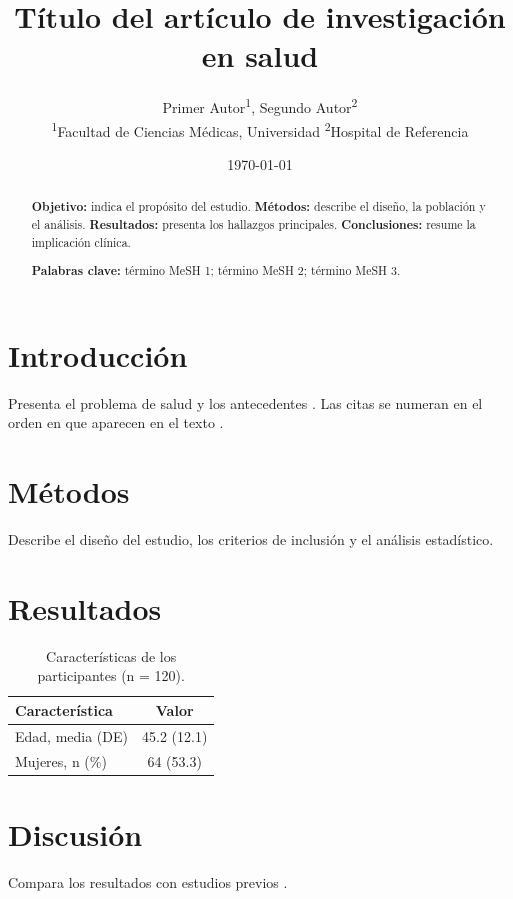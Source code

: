 \documentclass[11pt,a4paper]{article}
\title{Título del artículo de investigación en salud}
\author{Primer Autor\textsuperscript{1}, Segundo Autor\textsuperscript{2}\\[0.5em]
  \small\textsuperscript{1}Facultad de Ciencias Médicas, Universidad \quad
  \textsuperscript{2}Hospital de Referencia}
\date{\today}
\begin{document}
\maketitle

\begin{abstract}
\textbf{Objetivo:} indica el propósito del estudio.
\textbf{Métodos:} describe el diseño, la población y el análisis.
\textbf{Resultados:} presenta los hallazgos principales.
\textbf{Conclusiones:} resume la implicación clínica.

\medskip
\noindent\textbf{Palabras clave:} término MeSH 1; término MeSH 2; término MeSH 3.
\end{abstract}

\section{Introducción}
Presenta el problema de salud y los antecedentes \cite{icmje2019}. Las citas se
numeran en el orden en que aparecen en el texto \cite{lamport1994,knuth1984}.

\section{Métodos}
Describe el diseño del estudio, los criterios de inclusión y el análisis estadístico.

\section{Resultados}
\begin{table}[htbp]
  \centering
  \caption{Características de los participantes (n = 120).}
  \begin{tabular}{lc}
    \toprule
    Característica & Valor \\
    \midrule
    Edad, media (DE) & 45.2 (12.1) \\
    Mujeres, n (\%) & 64 (53.3) \\
    \bottomrule
  \end{tabular}
\end{table}

\section{Discusión}
Compara los resultados con estudios previos \cite{goossens2004}.

\printbibliography[title=Referencias]
\end{document}
